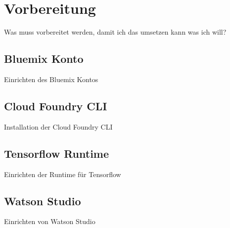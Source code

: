 \section{Vorbereitung}
Was muss vorbereitet werden, damit ich das umsetzen kann was ich will?

\subsection{Bluemix Konto}
Einrichten des Bluemix Kontos

\subsection{Cloud Foundry CLI}
Installation der Cloud Foundry CLI

\subsection{Tensorflow Runtime}
Einrichten der Runtime für Tensorflow

\subsection{Watson Studio}
Einrichten von Watson Studio